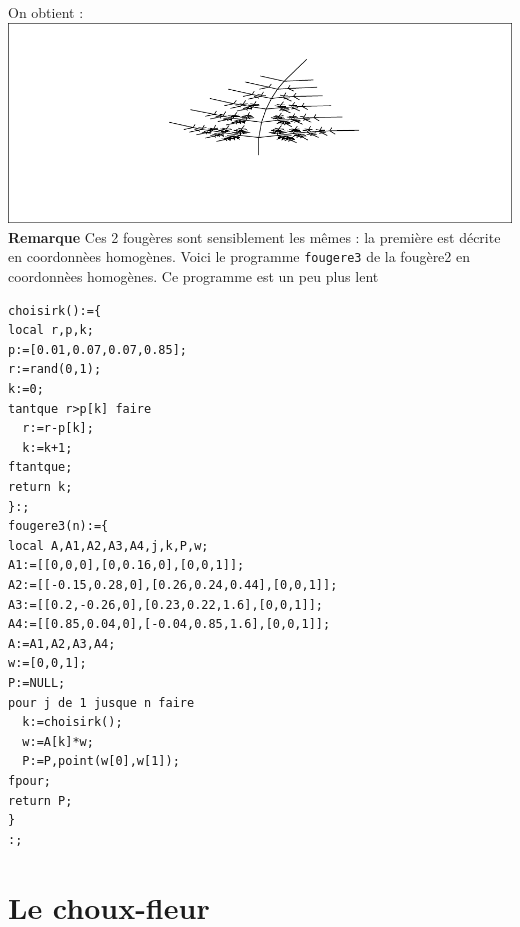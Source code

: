 \documentclass[a4paper,11pt]{book}
\begin{document}
On obtient :\\
\includegraphics[width=\textwidth]{fougere2}
{\bf Remarque}
Ces 2 foug\`eres sont sensiblement les m\^emes : la premi\`ere est d\'ecrite en 
coordonn\`ees homog\`enes. Voici le programme {\tt fougere3}
de la foug\`ere2 en coordonn\`ees homog\`enes. Ce programme est un peu plus lent
\begin{verbatim}
choisirk():={
local r,p,k;
p:=[0.01,0.07,0.07,0.85];
r:=rand(0,1);
k:=0;
tantque r>p[k] faire 
  r:=r-p[k];
  k:=k+1;
ftantque;
return k;
}:;
fougere3(n):={
local A,A1,A2,A3,A4,j,k,P,w;
A1:=[[0,0,0],[0,0.16,0],[0,0,1]];
A2:=[[-0.15,0.28,0],[0.26,0.24,0.44],[0,0,1]];
A3:=[[0.2,-0.26,0],[0.23,0.22,1.6],[0,0,1]];
A4:=[[0.85,0.04,0],[-0.04,0.85,1.6],[0,0,1]];
A:=A1,A2,A3,A4;
w:=[0,0,1];
P:=NULL;
pour j de 1 jusque n faire
  k:=choisirk();
  w:=A[k]*w;
  P:=P,point(w[0],w[1]);
fpour;
return P;
}
:;
\end{verbatim}
\section{Le choux-fleur}
\end{document}
